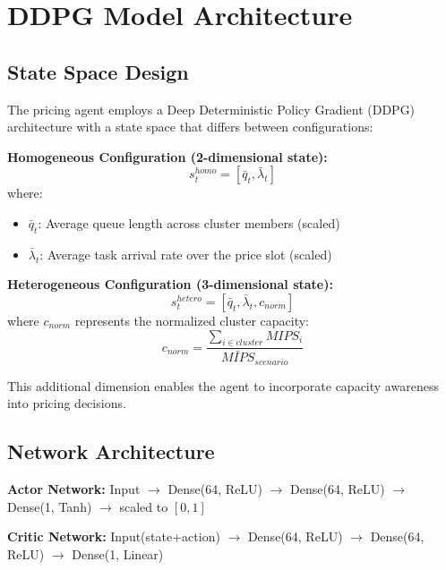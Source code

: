 \documentclass[conference]{IEEEtran}
\begin{document}
\section{DDPG Model Architecture}

\subsection{State Space Design}

The pricing agent employs a Deep Deterministic Policy Gradient (DDPG) architecture with a state space that differs between configurations:

\textbf{Homogeneous Configuration (2-dimensional state):}
\begin{equation}
s_t^{homo} = [\bar{q}_t, \bar{\lambda}_t]
\end{equation}
where:
\begin{itemize}
    \item $\bar{q}_t$: Average queue length across cluster members (scaled)
    \item $\bar{\lambda}_t$: Average task arrival rate over the price slot (scaled)
\end{itemize}

\textbf{Heterogeneous Configuration (3-dimensional state):}
\begin{equation}
s_t^{hetero} = [\bar{q}_t, \bar{\lambda}_t, c_{norm}]
\end{equation}
where $c_{norm}$ represents the normalized cluster capacity:
\begin{equation}
c_{norm} = \frac{\sum_{i \in cluster} MIPS_i}{\bar{MIPS}_{scenario}}
\end{equation}

This additional dimension enables the agent to incorporate capacity awareness into pricing decisions.

\subsection{Network Architecture}

\textbf{Actor Network:} Input $\rightarrow$ Dense(64, ReLU) $\rightarrow$ Dense(64, ReLU) $\rightarrow$ Dense(1, Tanh) $\rightarrow$ scaled to $[0, 1]$

\textbf{Critic Network:} Input(state+action) $\rightarrow$ Dense(64, ReLU) $\rightarrow$ Dense(64, ReLU) $\rightarrow$ Dense(1, Linear)
\end{document}
